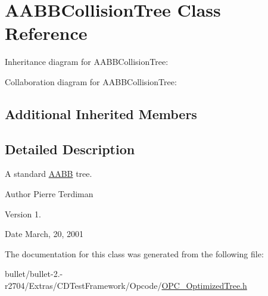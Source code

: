 \hypertarget{class_a_a_b_b_collision_tree}{\section{A\+A\+B\+B\+Collision\+Tree Class Reference}
\label{class_a_a_b_b_collision_tree}
}


Inheritance diagram for A\+A\+B\+B\+Collision\+Tree\+:


Collaboration diagram for A\+A\+B\+B\+Collision\+Tree\+:
\subsection*{Additional Inherited Members}


\subsection{Detailed Description}
A standard \hyperlink{class_a_a_b_b}{A\+A\+B\+B} tree.

\begin{DoxyAuthor}{Author}
Pierre Terdiman 
\end{DoxyAuthor}
\begin{DoxyVersion}{Version}
1. 
\end{DoxyVersion}
\begin{DoxyDate}{Date}
March, 20, 2001 
\end{DoxyDate}


The documentation for this class was generated from the following file\+:\begin{DoxyCompactItemize}
\item 
bullet/bullet-\/2.-\/r2704/\+Extras/\+C\+D\+Test\+Framework/\+Opcode/\hyperlink{_o_p_c___optimized_tree_8h}{O\+P\+C\+\_\+\+Optimized\+Tree.\+h}\end{DoxyCompactItemize}
